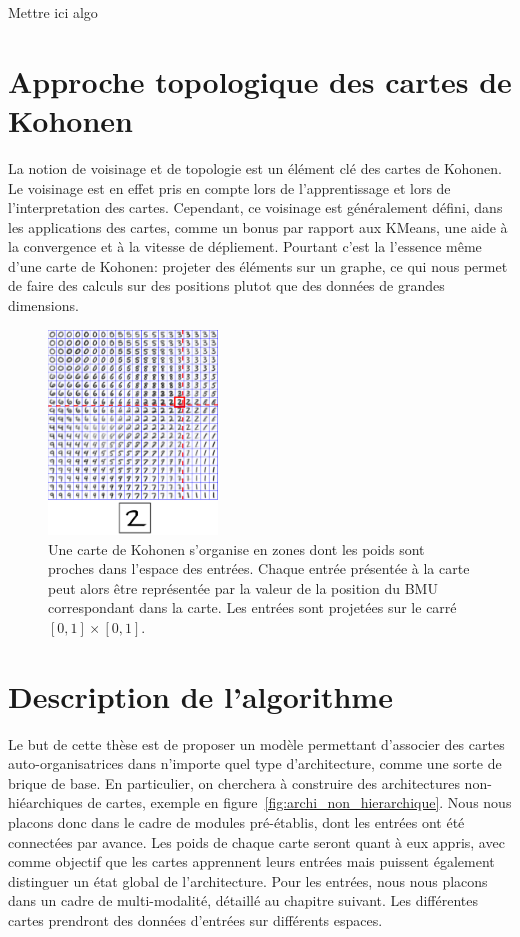 Mettre ici algo

\section{Approche topologique des cartes de Kohonen}

La notion de voisinage et de topologie est un élément clé des cartes de Kohonen. Le voisinage est en effet pris en compte lors de l'apprentissage et lors de l'interpretation des cartes. Cependant, ce voisinage est généralement défini, dans les applications des cartes, comme un bonus par rapport aux KMeans, une aide à la convergence et à la vitesse de dépliement. Pourtant c'est la l'essence même d'une carte de Kohonen: projeter des éléments sur un graphe, ce qui nous permet de faire des calculs sur des positions plutot que des données de grandes dimensions. 
\begin{figure}
\centering
\includegraphics[width=0.4\textwidth]{digits002.pdf}
\caption{Une carte de Kohonen s'organise en zones dont les poids sont proches dans l'espace des entrées. Chaque entrée présentée à la carte peut alors être représentée par la valeur de la position du BMU correspondant dans la carte. Les entrées sont projetées sur le carré $[0,1] \times [0,1]$.}
\end{figure}


\section{Description de l'algorithme}

Le but de cette thèse est de proposer un modèle permettant d'associer des cartes auto-organisatrices dans n'importe quel type d'architecture, comme une sorte de brique de base. En particulier, on cherchera à construire des architectures non-hiéarchiques de cartes, exemple en figure~\ref{fig:archi_non_hierarchique}.
Nous nous placons donc dans le cadre de modules pré-établis, dont les entrées ont été connectées par avance. Les poids de chaque carte seront quant à eux appris, avec comme objectif que les cartes apprennent leurs entrées mais puissent également distinguer un état global de l'architecture.
Pour les entrées, nous nous placons dans un cadre de multi-modalité, détaillé au chapitre suivant. Les différentes cartes prendront des données d'entrées sur différents espaces.

